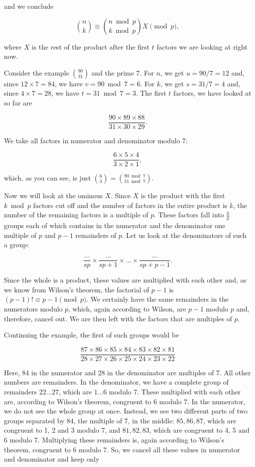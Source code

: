 \documentclass[tikz]{scrreprt}
\begin{document}
and we conclude 

\begin{equation}\label{eq:lucasX}
\binom{n}{k} \equiv \binom{n \bmod p}{k \bmod p} X \pmod{p},
\end{equation}

where $X$ is the rest of the product after 
the first $t$ factors we are looking at right now.

Consider the example $\binom{90}{31}$ and
the prime 7. For $n$, we get
$u = 90 / 7 = 12$ and, since $12 \times 7 = 84$,
we have $v = 90 \bmod 7 = 6$.
For $k$, we get
$s = 31 / 7 = 4$ and, since $4 \times 7 = 28$,
we have $t = 31 \bmod 7 = 3$.
The first $t$ factors, we have looked at so far
are

\[
\frac{90 \times 89 \times 88}{31 \times 30 \times 29}.
\]

We take all factors in numerator
and denominator modulo 7:

\[
\frac{6 \times 5 \times 4}{3 \times 2 \times 1},
\]

which, as you can see, is just
$\binom{6}{3} = \binom{90 \bmod 7}{31 \bmod 7}$.

Now we will look at the ominous $X$.
Since $X$ is the product with the first
$k \bmod p$ factors cut off and
the number of factors in the entire product is $k$,
the number of the remaining factors 
is a multiple of $p$.
These factors fall into $\frac{k}{p}$ groups
each of which contains 
in the numerator and the denominator
one multiple of $p$ and $p-1$ remainders of $p$.
Let us look at the denominators of such a group: 

\[
\frac{\dots}{sp} \times \frac{\dots}{sp+1} \times \dots \times
\frac{\dots}{sp+p-1}.
\]

Since the whole is a product,
these values are multiplied with each other
and, as we know from Wilson's theorem,
the factorial of $p-1$ is $(p-1)! \equiv p-1 \pmod{p}$.
We certainly have the same remainders in the numerators
modulo $p$, which, again according to Wilson,
are $p-1$ modulo $p$ and, therefore, cancel out.
We are then left with the factors that are multiples
of $p$.

Continuing the example, the first of such groups would be

\[
\frac{87 \times 86 \times 85 \times 84 \times 83 \times 82 \times 81}
     {28 \times 27 \times 26 \times 25 \times 24 \times 23 \times 22}
\]

Here, 84 in the numerator and 28 in the denominator are 
multiples of 7. All other numbers are remainders.
In the denominator, we have a complete group of remainders
$22\dots 27$, which are $1\dots 6$ modulo 7.
These multiplied with each other are,
according to Wilson's theorem, congruent to 6 modulo 7.
In the numerator, we do not see the whole group at once.
Instead, we see two different parts of two groups
separated by 84, the multiple of 7, in the middle:
$85,86,87$, which are congruent to 1, 2 and 3 modulo 7,
and $81,82,83$, which are congruent to 4, 5 and 6 modulo 7.
Multiplying these remainders is, again
according to Wilson's theorem, congruent to 6 modulo 7.
So, we cancel all these values in numerator and denominator
and keep only
\end{document}
